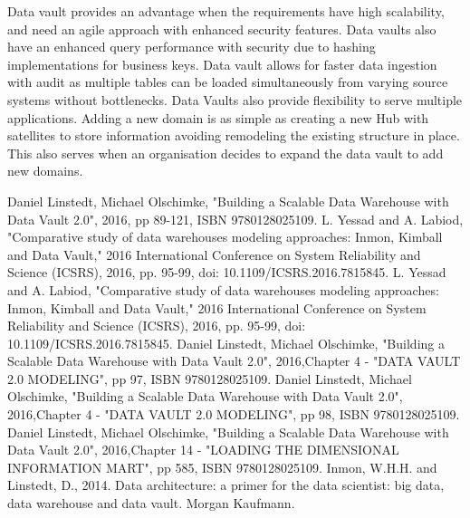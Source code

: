 \documentclass[conference]{IEEEtran}
\begin{document}
Data vault provides an advantage when the requirements have high scalability, and need an agile approach with enhanced security features. Data vaults also have an enhanced query performance with security due to hashing implementations for business keys. Data vault allows for faster data ingestion with audit as multiple tables can be loaded simultaneously from varying source systems without bottlenecks. Data Vaults also provide flexibility to serve multiple applications. Adding a new domain is as simple as creating a new Hub with satellites to store information avoiding remodeling the existing structure in place. This also serves when an organisation decides to expand the data vault to add new domains.

\begin{thebibliography}{00}
 Daniel Linstedt, Michael Olschimke, "Building a Scalable Data Warehouse with Data Vault 2.0", 2016, pp 89-121, ISBN 9780128025109.
 L. Yessad and A. Labiod, "Comparative study of data warehouses modeling approaches: Inmon, Kimball and Data Vault," 2016 International Conference on System Reliability and Science (ICSRS), 2016, pp. 95-99, doi: 10.1109/ICSRS.2016.7815845.
 L. Yessad and A. Labiod, "Comparative study of data warehouses modeling approaches: Inmon, Kimball and Data Vault," 2016 International Conference on System Reliability and Science (ICSRS), 2016, pp. 95-99, doi: 10.1109/ICSRS.2016.7815845.
 Daniel Linstedt, Michael Olschimke, "Building a Scalable Data Warehouse with Data Vault 2.0", 2016,Chapter 4 - "DATA VAULT 2.0 MODELING", pp 97, ISBN 9780128025109.
 Daniel Linstedt, Michael Olschimke, "Building a Scalable Data Warehouse with Data Vault 2.0", 2016,Chapter 4 - "DATA VAULT 2.0 MODELING", pp 98, ISBN 9780128025109.
 Daniel Linstedt, Michael Olschimke, "Building a Scalable Data Warehouse with Data Vault 2.0", 2016,Chapter 14 - "LOADING THE DIMENSIONAL INFORMATION MART", pp 585, ISBN 9780128025109.
 Inmon, W.H.H. and Linstedt, D., 2014. Data architecture: a primer for the data scientist: big data, data warehouse and data vault. Morgan Kaufmann.
\end{thebibliography}
\end{document}
